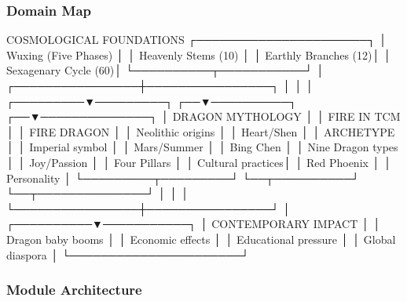 \documentclass[11pt,letterpaper]{article}
\begin{document}
\subsubsection{Domain Map}

\begin{asciibox}
                    COSMOLOGICAL FOUNDATIONS
                    ┌──────────────────────┐
                    │  Wuxing (Five Phases) │
                    │  Heavenly Stems (10)  │
                    │  Earthly Branches (12)│
                    │  Sexagenary Cycle (60)│
                    └──────────┬───────────┘
                               │
              ┌────────────────┼────────────────┐
              │                │                │
    ┌─────────▼─────────┐  ┌──▼──────────┐  ┌──▼──────────────┐
    │  DRAGON MYTHOLOGY  │  │ FIRE IN TCM │  │  FIRE DRAGON    │
    │  Neolithic origins │  │ Heart/Shen  │  │  ARCHETYPE      │
    │  Imperial symbol   │  │ Mars/Summer │  │  Bing Chen      │
    │  Nine Dragon types │  │ Joy/Passion │  │  Four Pillars   │
    │  Cultural practices│  │ Red Phoenix │  │  Personality     │
    └─────────┬─────────┘  └──┬──────────┘  └──┬──────────────┘
              │                │                │
              └────────────────┼────────────────┘
                               │
                    ┌──────────▼───────────┐
                    │  CONTEMPORARY IMPACT  │
                    │  Dragon baby booms    │
                    │  Economic effects     │
                    │  Educational pressure │
                    │  Global diaspora      │
                    └──────────────────────┘
\end{asciibox}

\subsubsection{Module Architecture}
\end{document}
